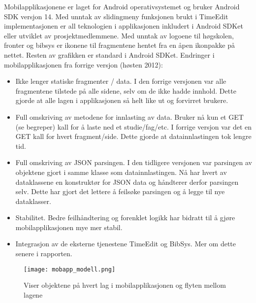 \documentclass[../main.tex]{subfiles}
\begin{document}
Mobilapplikasjonene er laget for Android operativsystemet og bruker Android SDK versjon 14. Med unntak av slidingmeny funksjonen brukt i TimeEdit implementasjonen er all teknologien i applikasjonen inkludert i Android SDKet eller utviklet av prosjektmedlemmene. Med unntak av logoene til høgskolen, fronter og bibsys er ikonene til fragmentene hentet fra en åpen ikonpakke på nettet. Resten av grafikken er standard i Android SDKet.\newline
\newline
Endringer i mobilapplikasjonen fra forrige versjon (høsten 2012):
\begin{itemize}
\item Ikke lenger statiske fragmenter / data. I den forrige versjonen var alle fragmentene tilstede på alle sidene, selv om de ikke hadde innhold. Dette gjorde at alle lagen i applikasjonen så helt like ut og forvirret brukere.
\item Full omskriving av metodene for innlasting av data. Bruker nå kun et GET (se begreper) kall for å laste ned et studie/fag/etc. I forrige versjon var det en GET kall for hvert fragment/side. Dette gjorde at datainnlastingen tok lengre tid.
\item Full omskriving av JSON parsingen. I den tidligere versjonen var parsingen av objektene gjort i samme klasse som datainnlastingen. Nå har hvert av dataklassene en konstruktør for JSON data og håndterer derfor parsingen selv. Dette har gjort det lettere å feilsøke parsingen og å legge til nye dataklasser.
\item Stabilitet. Bedre feilhåndtering og forenklet logikk har bidratt til å gjøre mobilapplikasjonen mye mer stabil.
\item Integrasjon av de eksterne tjenestene TimeEdit og BibSys. Mer om dette senere i rapporten.
\end{itemize}

\begin{figure}[H]
  \centering
  \texttt{[image: mobapp\_modell.png]}
  \caption{Viser objektene på hvert lag i mobilapplikasjonen og flyten mellom lagene}
\end{figure}
\end{document}
